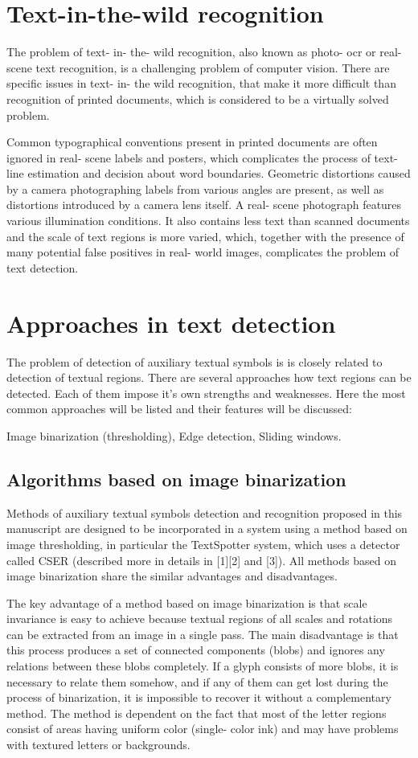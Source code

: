 \documentclass[12pt,a4paper]{report}
\begin{document}
\section{Text-in-the-wild recognition}
The problem of text- in- the- wild recognition, also known as photo- ocr or real- scene text recognition, is a challenging problem of computer vision. There are specific issues in text- in- the wild recognition, that make it more difficult than recognition of printed documents, which is considered to be a virtually solved problem.

Common typographical conventions present in printed documents are often ignored in real- scene labels and posters, which complicates the process of text- line estimation and decision about word boundaries. Geometric distortions caused by a camera photographing labels from various angles are present, as well as distortions introduced by a camera lens itself. A real- scene photograph features various illumination conditions. It also contains less text than scanned documents and the scale of text regions is more varied, which, together with the presence of many potential false positives in real- world images, complicates the problem of text detection.

\section{Approaches in text detection}
The problem of detection of auxiliary textual symbols is is closely related to detection of textual regions. There are several approaches how text regions can be detected. Each of them impose it's own strengths and weaknesses. Here the most common approaches will be listed and their features will be discussed:

Image binarization (thresholding), Edge detection, Sliding windows.

\subsection{Algorithms based on image binarization}
Methods of auxiliary textual symbols detection and recognition proposed in this manuscript are designed to be incorporated in a system using a method based on image thresholding, in particular the TextSpotter system, which uses a detector called CSER (described more in details in [1][2] and [3]). All methods based on image binarization share the similar advantages and disadvantages.

The key advantage of a method based on image binarization is that scale invariance is easy to achieve because textual regions of all scales and rotations can be extracted from an image in a single pass. The main disadvantage is that this process produces a set of connected components (blobs) and ignores any relations between these blobs completely. If a glyph consists of more blobs, it is necessary to relate them somehow, and if any of them can get lost during the process of binarization, it is impossible to recover it without a complementary method. The method is dependent on the fact that most of the letter regions consist of areas having uniform color (single- color ink) and may have problems with textured letters or backgrounds.
\end{document}
